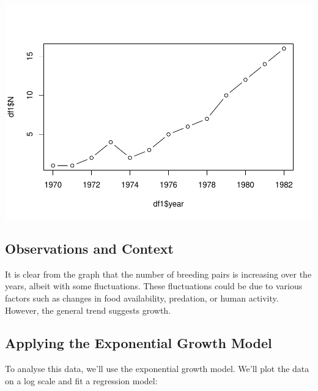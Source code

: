 \documentclass[
  a4paper]{book}
\newenvironment{Shaded}{\begin{snugshade}}{\end{snugshade}}
\newcommand{\AttributeTok}[1]{\textcolor[rgb]{0.13,0.29,0.53}{#1}}
\newcommand{\FunctionTok}[1]{\textcolor[rgb]{0.13,0.29,0.53}{\textbf{#1}}}
\newcommand{\NormalTok}[1]{#1}
\newcommand{\OtherTok}[1]{\textcolor[rgb]{0.56,0.35,0.01}{#1}}
\newcommand{\SpecialCharTok}[1]{\textcolor[rgb]{0.81,0.36,0.00}{\textbf{#1}}}
\begin{document}
\includegraphics{BB512_files/figure-latex/plotnewproj-1.pdf}

\subsection{Observations and Context}\label{observations-and-context}

It is clear from the graph that the number of breeding pairs is increasing over the years, albeit with some fluctuations. These fluctuations could be due to various factors such as changes in food availability, predation, or human activity. However, the general trend suggests growth.

\subsection{Applying the Exponential Growth Model}\label{applying-the-exponential-growth-model}

To analyse this data, we'll use the exponential growth model. We'll plot the data on a log scale and fit a regression model:

\begin{Shaded}
\end{Shaded}
\end{document}
